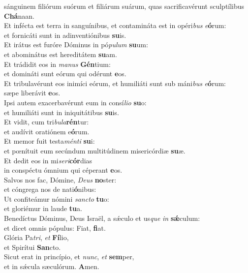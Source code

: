 \evenverse sánguinem filiórum suórum et filiárum suárum, quas sacrificavérunt sculptílibus \textbf{Chá}naan.\\
\oddverse Et infécta est terra in sanguínibus, et contamináta est in opéri\textit{bus} \textit{e}\textbf{ó}rum:~\*\\
\oddverse et fornicáti sunt in adinventiónibus \textbf{su}is.\\
\evenverse Et irátus est furóre Dóminus in pó\textit{pu}\textit{lum} \textbf{su}um:~\*\\
\evenverse et abominátus est hereditátem \textbf{su}am.\\
\oddverse Et trádidit eos in \textit{ma}\textit{nus} \textbf{Gén}tium:~\*\\
\oddverse et domináti sunt eórum qui odérunt \textbf{e}os.\\
\evenverse Et tribulavérunt eos inimíci eórum, et humiliáti sunt sub máni\textit{bus} \textit{e}\textbf{ó}rum:~\*\\
\evenverse sæpe liberávit \textbf{e}os.\\
\oddverse Ipsi autem exacerbavérunt eum in consí\textit{li}\textit{o} \textbf{su}o:~\*\\
\oddverse et humiliáti sunt in iniquitátibus \textbf{su}is.\\
\evenverse Et vidit, cum tri\textit{bu}\textit{la}\textbf{rén}tur:~\*\\
\evenverse et audívit oratiónem e\textbf{ó}rum.\\
\oddverse Et memor fuit testa\textit{mén}\textit{ti} \textbf{su}i:~\*\\
\oddverse et pœnítuit eum secúndum multitúdinem misericórdiæ \textbf{su}æ.\\
\evenverse Et dedit eos in mi\textit{se}\textit{ri}\textbf{cór}dias~\*\\
\evenverse in conspéctu ómnium qui céperant \textbf{e}os.\\
\oddverse Salvos nos fac, Dómine, \textit{De}\textit{us} \textbf{no}ster:~\*\\
\oddverse et cóngrega nos de nati\textbf{ó}nibus:\\
\evenverse Ut confiteámur nómini \textit{san}\textit{cto} \textbf{tu}o:~\*\\
\evenverse et gloriémur in laude \textbf{tu}a.\\
\oddverse Benedíctus Dóminus, Deus Israël, a sǽculo et us\textit{que} \textit{in} \textbf{sǽ}culum:~\*\\
\oddverse et dicet omnis pópulus: Fiat, \textbf{fi}at.\\
\evenverse Glória Pa\textit{tri}, \textit{et} \textbf{Fí}lio,~\*\\
\evenverse et Spirítui \textbf{San}cto.\\
\oddverse Sicut erat in princípio, et \textit{nunc}, \textit{et} \textbf{sem}per,~\*\\
\oddverse et in sǽcula sæculórum. \textbf{A}men.\\
